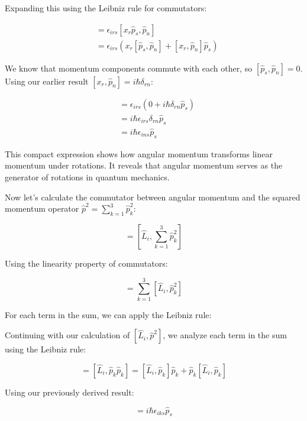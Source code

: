 \documentclass[italian]{HKNdocument}
\begin{document}
Expanding this using the Leibniz rule for commutators:

\begin{align}
[\hat{L}_i, \hat{p}_n] &= \epsilon_{irs}[x_r\hat{p}_s, \hat{p}_n] \\
&= \epsilon_{irs}(x_r[\hat{p}_s, \hat{p}_n] + [x_r, \hat{p}_n]\hat{p}_s)
\end{align}

We know that momentum components commute with each other, so $[\hat{p}_s, \hat{p}_n] = 0$. Using our earlier result $[x_r, \hat{p}_n] = i\hbar\delta_{rn}$:

\begin{align}
[\hat{L}_i, \hat{p}_n] &= \epsilon_{irs}(0 + i\hbar\delta_{rn}\hat{p}_s) \\
&= i\hbar\epsilon_{irs}\delta_{rn}\hat{p}_s \\
&= i\hbar\epsilon_{ins}\hat{p}_s
\end{align}

This compact expression shows how angular momentum transforms linear momentum under rotations. It reveals that angular momentum serves as the generator of rotations in quantum mechanics.

Now let's calculate the commutator between angular momentum and the squared momentum operator $\hat{p}^2 = \sum_{k=1}^3 \hat{p}_k^2$:

\begin{equation}
[\hat{L}_i, \hat{p}^2] = \left[\hat{L}_i, \sum_{k=1}^3 \hat{p}_k^2\right]
\end{equation}

Using the linearity property of commutators:

\begin{equation}
[\hat{L}_i, \hat{p}^2] = \sum_{k=1}^3 [\hat{L}_i, \hat{p}_k^2]
\end{equation}

For each term in the sum, we can apply the Leibniz rule:

Continuing with our calculation of $[\hat{L}_i, \hat{p}^2]$, we analyze each term in the sum using the Leibniz rule:

\begin{equation}
[\hat{L}_i, \hat{p}_k^2] = [\hat{L}_i, \hat{p}_k\hat{p}_k] = [\hat{L}_i, \hat{p}_k]\hat{p}_k + \hat{p}_k[\hat{L}_i, \hat{p}_k] \label{eq:1.68}
\end{equation}

Using our previously derived result:

\begin{equation}
[\hat{L}_i, \hat{p}_k] = i\hbar\epsilon_{iks}\hat{p}_s
\end{equation}
\end{document}
